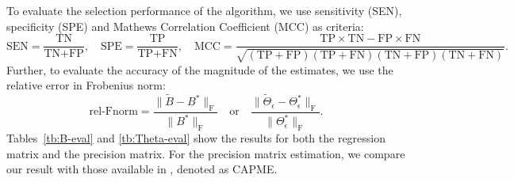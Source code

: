 To evaluate the selection performance of the algorithm, we use sensitivity (SEN), specificity (SPE) and Mathews Correlation Coefficient (MCC) as criteria:
\begin{equation*}
\textrm{SEN} = \frac{\textrm{TN}}{\textrm{TN}+\textrm{FP}},\quad \textrm{SPE} = \frac{\textrm{TP}}{\textrm{TP}+\textrm{FN}}, \quad \textrm{MCC} = \frac{\textrm{TP}\times\textrm{TN}-\textrm{FP}\times \textrm{FN}}{\sqrt{(\textrm{TP}+\textrm{FP})(\textrm{TP}+\textrm{FN})(\textrm{TN}+\textrm{FP})(\textrm{TN}+\textrm{FN})}}.
\end{equation*}
Further, to evaluate the accuracy of the magnitude of the estimates, we use the relative error in Frobenius norm:
\begin{equation*}
\textrm{rel-Fnorm} = \frac{\|\widetilde{B}-B^*\|_\textrm{F}}{\|B^*\|_\textrm{F}}\quad \text{or}\quad \frac{\|\widetilde{\Theta}_\epsilon-\Theta_\epsilon^*\|_\textrm{F}}{\|\Theta_\epsilon^*\|_\textrm{F}}.
\end{equation*}
Tables~\ref{tb:B-eval} and \ref{tb:Theta-eval} show the results for both the regression matrix and the precision matrix. For the precision matrix estimation, we compare our result with those available in \citet{cai2012covariate}, denoted as CAPME.

